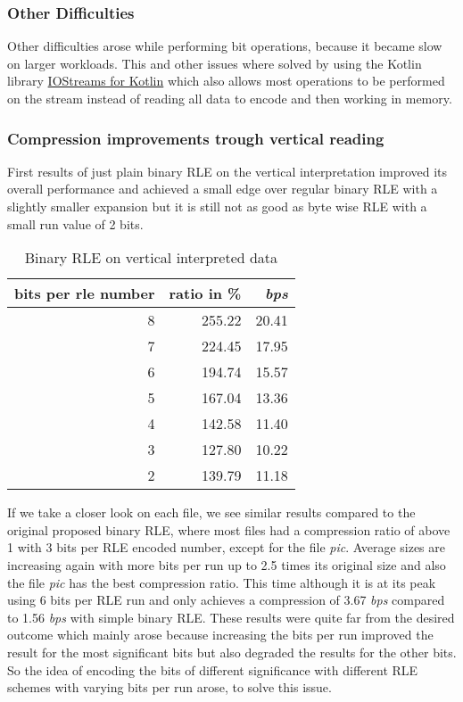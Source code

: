 \subsubsection{Other Difficulties}
\par{
Other difficulties arose while performing bit operations, because it became slow on larger workloads. This and other issues where solved by using the Kotlin library  \href{https://discuss.kotlinlang.org/t/i-o-streams-for-kotlin/9802}{IOStreams for Kotlin}} which also allows most operations to be performed on the stream instead of reading all data to encode and then working in memory.

\subsubsection{Compression improvements trough vertical reading}
\par{
First results of just plain binary RLE on the vertical interpretation improved its overall performance and achieved a small edge over regular binary RLE with a slightly smaller expansion but it is still not as good as byte wise RLE with a small run value of 2 bits.
\begin{table}[H]
	\centering
	\begin{tabular}{r|r|r}	
		bits per rle number & ratio in \% & \textit{bps}\\
		\hline
		8 & 255.22 & 20.41\\
		7 & 224.45 & 17.95\\
		6 & 194.74 & 15.57\\
		5 & 167.04 & 13.36\\
		4 & 142.58 & 11.40\\
		3 & 127.80 & 10.22\\
		2 & 139.79 & 11.18 \\
	\end{tabular}
	\caption{Binary RLE on vertical interpreted data}
	\label{tab:t30 binary RLE on vertical interpreted data}
\end{table}
}

\par{
If we take a closer look on each file, we see similar results compared to the original proposed binary RLE, where most files had a compression ratio of above 1 with 3 bits per RLE encoded number, except for the file \textit{pic}. Average sizes are increasing again with more bits per run up to 2.5 times its original size and also the file \textit{pic} has the best compression ratio. This time although it is at its peak using 6 bits per RLE run and only achieves a compression of 3.67 \textit{bps} compared to 1.56 \textit{bps} with simple binary RLE. These results were quite far from the desired outcome which mainly arose because increasing the bits per run improved the result for the most significant bits but also degraded the results for the other bits. So the idea of encoding the bits of different significance with different RLE schemes with varying bits per run arose, to solve this issue.  
}

